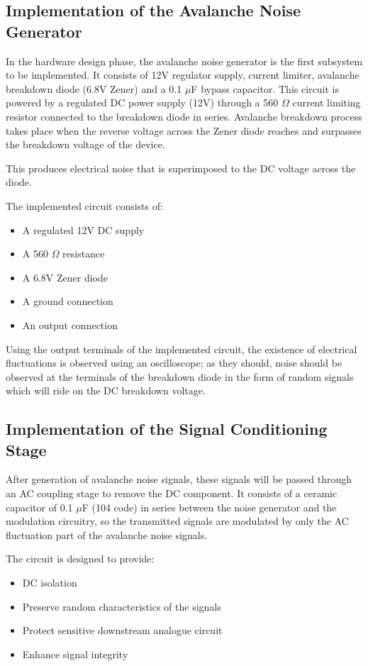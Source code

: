 \documentclass[12pt,a4paper]{report}
\begin{document}
	\subsection{Implementation of the Avalanche Noise Generator}
	In the hardware design phase, the avalanche noise generator is the first subsystem to be implemented. It consists of 12V regulator supply, current limiter, avalanche breakdown diode (6.8V Zener) and a 0.1 $\mu$F bypass capacitor. This circuit is powered by a regulated DC power supply (12V) through a 560 $\Omega$ current limiting resistor connected to the breakdown diode in series. Avalanche breakdown process takes place when the reverse voltage across the Zener diode reaches and surpasses the breakdown voltage of the device.
	
	This produces electrical noise that is superimposed to the DC voltage across the diode.
	
	The implemented circuit consists of:
	\begin{itemize}
		\item A regulated 12V DC supply
		\item A 560 $\Omega$ resistance
		\item A 6.8V Zener diode
		\item A ground connection
		\item An output connection
	\end{itemize}
	
	Using the output terminals of the implemented circuit, the existence of electrical fluctuations is observed using an oscilloscope; as they should, noise should be observed at the terminals of the breakdown diode in the form of random signals which will ride on the DC breakdown voltage.
	
	\subsection{Implementation of the Signal Conditioning Stage}
	After generation of avalanche noise signals, these signals will be passed through an AC coupling stage to remove the DC component. It consists of a ceramic capacitor of 0.1 $\mu$F (104 code) in series between the noise generator and the modulation circuitry, so the transmitted signals are modulated by only the AC fluctuation part of the avalanche noise signals.
	
	The circuit is designed to provide:
	\begin{itemize}
		\item DC isolation
		\item Preserve random characteristics of the signals
		\item Protect sensitive downstream analogue circuit
		\item Enhance signal integrity
	\end{itemize}
	
\end{document}

